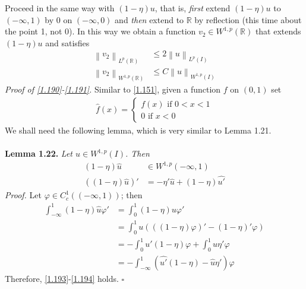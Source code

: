 \documentclass[a4paper,oneside]{book}
\numberwithin{equation}{chapter}
\begin{document}
Proceed in the same way with $\left(1-\eta \right)u$, that is, \textit{first} extend $\left(1-\eta \right)u$ to $\left(-\infty,1\right)$ by 0 on $\left(-\infty,0\right)$ and \textit{then} extend to $\mathbb{R}$ by reflection (this time about the point 1, not 0). In this way we obtain a function $v_2\in W^{1,p}\left(\mathbb{R}\right)$ that extends $\left(1-\eta \right)u$ and satisfies
\begin{align}
\label{1.190}
{\left\| {{v_2}} \right\|_{{L^p}\left( \mathbb{R} \right)}} &\le 2{\left\| u \right\|_{{L^p}\left( I \right)}}\\
{\left\| {{v_2}} \right\|_{{W^{1,p}}\left( \mathbb{R} \right)}} &\le C{\left\| u \right\|_{{W^{1,p}}\left( I \right)}} \label{1.191}
\end{align}
\textit{Proof of \eqref{1.190}-\eqref{1.191}.} Similar to \eqref{1.151}, given a function $f$ on $\left(0,1\right)$ set
\begin{align}
\hat f\left( x \right) = \left\{ {\begin{array}{*{20}{c}}
{f\left( x \right)\mbox{ if } 0 < x < 1}\\
{0\mbox{ if } x < 0}
\end{array}} \right.
\end{align}
We shall need the following lemma, which is very similar to Lemma 1.21.\\
\\
\textbf{Lemma 1.22.} \textit{Let $u\in W^{1,p}\left(I\right)$. Then}
\begin{align}
\label{1.193}
\left( {1 - \eta } \right)\hat u &\in {W^{1,p}}\left( { - \infty ,1} \right)\\
\left( {\left( {1 - \eta } \right)\hat u} \right)' &=  - \eta '\hat u + \left( {1 - \eta } \right)\widehat {u'} \label{1.194}
\end{align}
\textit{Proof.} Let $\varphi  \in C_c^1\left( {\left( { - \infty ,1} \right)} \right)$; then
\begin{align}
\int_{ - \infty }^1 {\left( {1 - \eta } \right)\hat u\varphi '}  &= \int_0^1 {\left( {1 - \eta } \right)u\varphi '} \\
& = \int_0^1 {u\left( {\left( {\left( {1 - \eta } \right)\varphi } \right)' - \left( {1 - \eta } \right)'\varphi } \right)} \\
& =  - \int_0^1 {u'\left( {1 - \eta } \right)\varphi }  + \int_0^1 {u\eta '\varphi } \\
& =  - \int_{ - \infty }^1 {\left( {\widehat {u'}\left( {1 - \eta } \right) - \hat u\eta '} \right)\varphi } 
\end{align}
Therefore, \eqref{1.193}-\eqref{1.194} holds. \hfill $\square$\\
\end{document}
